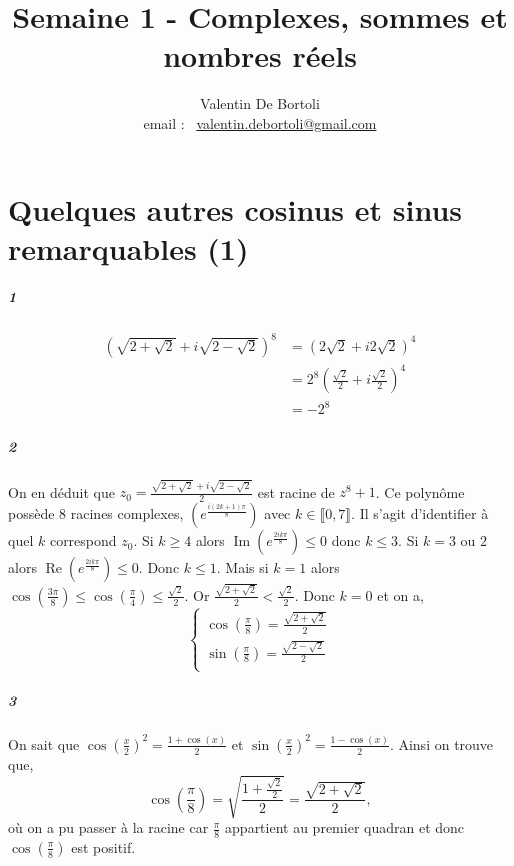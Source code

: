 \documentclass[10pt,a4paper]{article}
\title{Semaine 1 - Complexes, sommes et nombres réels}
\author{Valentin De Bortoli \\ email : \ \href{mailto:valentin.debortoli@gmail.com}{valentin.debortoli@gmail.com}}
\date{}
\begin{document}
\maketitle

\section{Quelques autres cosinus et sinus remarquables (1)}
\subparagraph{1}\begin{equation}
\begin{aligned}(\sqrt{2+\sqrt{2}}+i \sqrt{2-\sqrt{2}})^8 &= (2 \sqrt{2} + i 2\sqrt{2})^4 \\
&= 2^8 \left( \frac{\sqrt{2}}{2} + i\frac{\sqrt{2}}{2} \right)^4 \\
&= -2^8
\end{aligned}
\end{equation}
\subparagraph{2}On en déduit que $z_0 = \frac{\sqrt{2+\sqrt{2}} + i \sqrt{2-\sqrt{2}}}{2}$ est racine de $z^8+1$. Ce polynôme possède 8 racines complexes, $(e^{\frac{i(2k+1)\pi}{8}})$ avec $k \in \llbracket 0,7 \rrbracket$. Il s'agit d'identifier à quel $k$ correspond $z_0$. Si $k\ge 4$ alors $\operatorname{Im} \left( e^{\frac{2ik\pi}{8}}\right) \le 0$ donc $k\le 3$. Si $k=3$ ou $2$ alors $\operatorname{Re} \left( e^{\frac{2ik\pi}{8}}\right) \le 0$. Donc $k \le 1$. Mais si $k=1$ alors $\cos\left( \frac{3 \pi}{8} \right) \le \cos \left( \frac{\pi}{4} \right) \le \frac{\sqrt{2}}{2}$. Or $\frac{\sqrt{2+\sqrt{2}}}{2} < \frac{\sqrt{2}}{2}$. Donc $k=0$ et on a,
\begin{equation}
\left\lbrace
\begin{aligned}
\cos \left( \frac{\pi}{8} \right)= \frac{\sqrt{2+\sqrt{2}}}{2} \\
\sin\left(\frac{\pi}{8} \right)= \frac{\sqrt{2-\sqrt{2}}}{2} \\
\end{aligned}\right.
\end{equation}
\subparagraph{3}On sait que $\cos \left( \frac{x}{2} \right)^2 = \frac{1+\cos(x)}{2}$ et $\sin \left( \frac{x}{2} \right)^2 = \frac{1-\cos(x)}{2}$. Ainsi on trouve que,
\begin{equation}
\cos \left( \frac{\pi}{8} \right) = \sqrt{\frac{1+ \frac{\sqrt{2}}{2}}{2}} = \frac{\sqrt{2+\sqrt{2}}}{2},
\end{equation}
où on a pu passer à la racine car $\frac{\pi}{8}$ appartient au premier quadran et donc $\cos \left( \frac{\pi}{8} \right)$ est positif.
\end{document}
